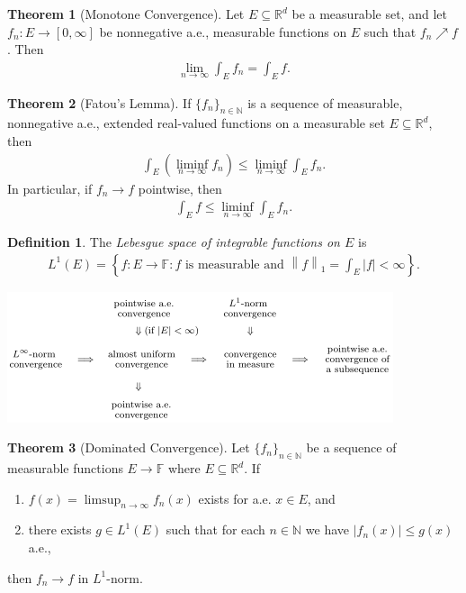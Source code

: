 \documentclass[a4paper,9pt]{extarticle}
\newcommand{\norm}[1]{\left\lVert#1\right\rVert}
\theoremstyle{definition}
\newtheorem{defin}{Definition}
\newtheorem{thm}{Theorem}
\begin{document}
\begin{thm}[Monotone Convergence]
    Let $E \subseteq \mathbb{R}^d$ be a measurable set, and let $f_n : E \to [0, \infty]$ be nonnegative a.e., measurable functions on $E$ such that $f_n \nearrow f$. Then
    \begin{align*}
        \lim_{n \to \infty} \int_E f_n = \int_E f.
    \end{align*}
\end{thm}
\begin{thm}[Fatou's Lemma]
    If $\{f_n\}_{n \in \mathbb{N}}$ is a sequence of measurable, nonnegative a.e., extended real-valued functions on a measurable set $E \subseteq \mathbb{R}^d$, then
    \begin{align*}
        \int_E \left( \liminf_{n \to \infty} f_n \right) \leq \liminf_{n \to \infty} \int_E f_n.
    \end{align*}
    In particular, if $f_n \to f$ pointwise, then
    \begin{align*}
        \int_E f \leq \liminf_{n \to \infty} \int_E f_n.
    \end{align*}
\end{thm}
\begin{defin}
    The \emph{Lebesgue space of integrable functions on $E$} is
    \begin{align*}
        L^1(E) = \left\{ f : E \to \mathbb{F} : f \text{ is measurable and } \norm{f}_1 = \int_E |f| < \infty \right\}.
    \end{align*}
\end{defin}
\begin{center}
    \includegraphics{convergence_relations}
\end{center}
\begin{thm}[Dominated Convergence]
    Let $\{f_n\}_{n \in \mathbb{N}}$ be a sequence of measurable functions $E \to \mathbb{F}$ where $E \subseteq \mathbb{R}^d$. If
    \begin{enumerate}[itemsep=0ex, label=(\alph*)]
        \item
            $f(x) = \limsup_{n \to \infty} f_n(x)$ exists for a.e. $x \in E$, and
        \item
            there exists $g \in L^1(E)$ such that for each $n \in \mathbb{N}$ we have $|f_n(x)| \leq g(x)$ a.e.,
    \end{enumerate}
    then $f_n \to f$ in $L^1$-norm.
\end{thm}
\end{document}
